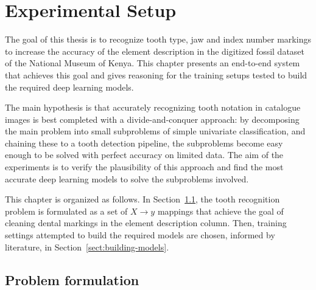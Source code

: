 \documentclass[english,twoside,openright]{UH_DS_MSc}
\begin{document}
\chapter{Experimental Setup}

The goal of this thesis is to recognize tooth type,
jaw and index number markings to increase the accuracy of the element description in
the digitized fossil dataset of the National Museum of Kenya. This 
chapter presents an end-to-end system that achieves this goal and gives reasoning 
for the training setups tested to build  the required deep learning models.

The main hypothesis is that accurately recognizing tooth notation in catalogue images 
is best completed with a divide-and-conquer approach: by decomposing the main problem into small
subproblems of simple univariate classification, and chaining these to a tooth detection pipeline,
the subproblems become easy enough to be solved with perfect accuracy on limited data.
The aim of the experiments is to verify the plausibility of this approach and find the most accurate deep 
learning models to solve the subproblems involved.

This chapter is organized as follows. In Section~\ref{sect:problem-formulation}, the tooth recognition problem is formulated as a set of $X\to y$ 
mappings that achieve the goal of cleaning dental markings in the element description column.
Then, training settings attempted to build the required models are chosen, informed by literature, in Section~\ref{sect:building-models}.

\section{Problem formulation}
\label{sect:problem-formulation}
\end{document}
